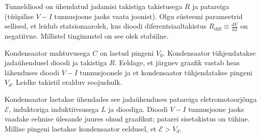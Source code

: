 \documentclass[a4paper,11pt,twocolumn]{article}
\begin{document}
\begin{question}
    Tunneldiood on ühendatud jadamisi takistiga takistusega $R$ ja patareiga (tüüpilise $V - I$ tunnusjoone jaoks vaata joonist). Olgu süsteemi parameetrid sellised, et leidub statsionaarolek, kus dioodi diferentsiaaltakistus $R_{\mathrm{diff}} \equiv \frac{\mathrm{d}V}{\mathrm{d}I}$ on negatiivne. Millistel tingimustel on see olek stabiilne.
\end{question}
\begin{figure}[h]
    \centering
\end{figure}

\begin{question}[vv2][4cm]
    Kondensaator mahtuvusega $C$ on laetud pingeni $V_0$. Kondensaator tühjendatakse jadaühendusel dioodi ja takistiga $R$. Eeldage, et järgnev graafik vastab heas lähenduses dioodi $V-I$ tunnusjoonele ja et kondensaator tühjendatakse pingeni $V_d$. Leidke takistil eralduv soojushulk.
\end{question}


\begin{question}
    Kondensaator laetakse ühendades see jadaühenduses patareiga eletromotoorjõuga $\mathcal{E}$, induktoriga induktiivsusega $L$ ja dioodiga. Dioodi $V-I$ tunnusjoone jaoks vaadake eelmise ülesande juures olnud graafikut; patarei sisetakistus on tühine. Millise pingeni laetakse kondensaator eeldusel, et $\mathcal{E}>V_d$.
\end{question}
\end{document}

